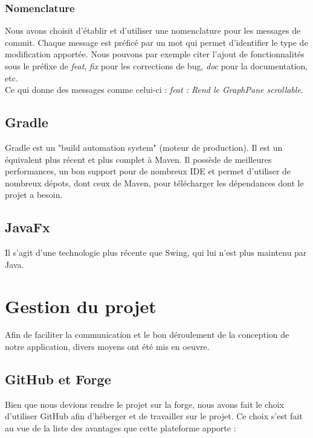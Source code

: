 			\subsubsection{Nomenclature}

				Nous avons choisit d'établir et d'utiliser une nomenclature pour les messages de commit. Chaque message est préficé par un mot qui permet d'identifier le type de modification apportée. Nous pouvons par exemple citer l'ajout de fonctionnalités sous le préfixe de \textit{feat}, \textit{fix} pour les corrections de bug, \textit{doc} pour la documentation, etc.\\
				Ce qui donne des messages comme celui-ci : \textit{feat : Rend le GraphPane scrollable}.

		\subsection{Gradle}

			Gradle est un "build automation system" (moteur de production). Il est un équivalent plus récent et plus complet à Maven. Il possède de meilleures performances, un bon support pour de nombreux IDE et permet d'utiliser de nombreux dépots, dont ceux de Maven, pour télécharger les dépendances dont le projet a besoin.

		\subsection{JavaFx}

			Il s'agit d'une technologie plus récente que Swing, qui lui n'est plus maintenu par Java.

	\section{Gestion du projet}

		Afin de faciliter la communication et le bon déroulement de la conception de notre application, divers moyens ont été mis en oeuvre.

		\subsection{GitHub et Forge}

			Bien que nous devions rendre le projet sur la forge, nous avons fait le choix d'utiliser GitHub afin d'héberger et de travailler sur le projet. Ce choix s'est fait au vue de la liste des avantages que cette plateforme apporte :

